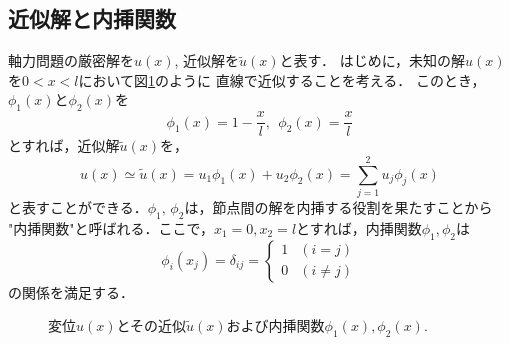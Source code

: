 \documentclass[10pt,a4j]{jarticle}
\begin{document}
\subsection{近似解と内挿関数}
軸力問題の厳密解を$u(x)$, 近似解を$\tilde u(x)$と表す．
はじめに，未知の解$u(x)$を$0<x<l$において図\ref{fig:fig9}のように
直線で近似することを考える．
このとき，$\phi_1(x)$と$\phi_2(x)$を
\begin{equation}
	\phi_1(x)= 1-\frac{x}{l}, \ \ 
	\phi_2(x)= \frac{x}{l}
	\label{eqn:basis}
\end{equation}
とすれば，近似解$\tilde u(x)$を，
\begin{equation}
	u(x)\simeq \tilde u (x)=u_1\phi_1(x)+ u_2\phi_2(x)=\sum_{j=1}^2u_j\phi_j(x)
	\label{eqn:u_tilde}
\end{equation}
と表すことができる．$\phi_1,\, \phi_2$は，節点間の解を内挿する役割を果たすことから
"内挿関数"と呼ばれる．ここで，$x_1=0, x_2=l$とすれば，内挿関数$\phi_1,\phi_2$は
\begin{equation}
	\phi_i(x_j)=\delta_{ij}
	=\left\{
	\begin{array}{cc}
		1 & (i=j)  \\
		0 & (i\neq j) 
	\end{array}
		\right.
	\label{eqn:phi_01}
\end{equation}
の関係を満足する．
\begin{figure}[h]
	\begin{center}
	\end{center}
	\caption{変位$u(x)$とその近似$\tilde u(x)$および内挿関数$\phi_1(x),\phi_2(x)$.} 
	\label{fig:fig9}
\end{figure}
\end{document}
